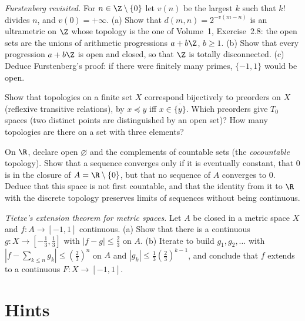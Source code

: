 \begin{exercise}[$\star\star$]\label{ex:furstenberg}
\emph{Furstenberg revisited.} For $n\in\Z\setminus\{0\}$ let $v(n)$ be the largest $k$ such that $k!$ divides $n$, and $v(0)=+\infty$. (a) Show that $d(m,n)=2^{-v(m-n)}$
is an ultrametric on $\Z$ whose topology is the one of Volume~1, Exercise~2.8: the open sets are the unions of arithmetic progressions $a+b\Z$,
$b\ge1$. (b) Show that every progression $a+b\Z$ is open and closed, so that $\Z$ is totally disconnected. (c) Deduce Furstenberg's proof: if there
were finitely many primes, $\{-1,1\}$ would be open.
\end{exercise}

\begin{exercise}[$\star\star$]\label{ex:finite}
Show that topologies on a finite set $X$ correspond bijectively to preorders on $X$ (reflexive transitive relations), by $x\preceq y$ iff $x\in\overline{\{y\}}$.
Which preorders give $T_0$ spaces (two distinct points are distinguished by an open set)? How many topologies are there on a set with
three elements?
\end{exercise}

\begin{exercise}[$\star\star$]\label{ex:cocountable}
On $\R$, declare open $\varnothing$ and the complements of countable sets (the \emph{cocountable} topology). Show that a sequence converges only if it is
eventually constant, that $0$ is in the closure of $A=\R\setminus\{0\}$, but that no sequence of $A$ converges to $0$. Deduce that this space is not first
countable, and that the identity from it to $\R$ with the discrete topology preserves limits of sequences without being continuous.
\end{exercise}

\begin{exercise}[$\star\star\star$]\label{ex:tietze}
\emph{Tietze's extension theorem for metric spaces.} Let $A$ be closed in a metric space $X$ and $f:A\to[-1,1]$ continuous. (a) Show that there is a
continuous $g:X\to[-\frac13,\frac13]$ with $|f-g|\le\frac23$ on $A$. (b) Iterate to build $g_1,g_2,\ldots$ with $|f-\sum_{k\le n}g_k|\le(\frac23)^n$ on $A$ and
$|g_k|\le\frac13(\frac23)^{k-1}$, and conclude that $f$ extends to a continuous $F:X\to[-1,1]$.
\end{exercise}

\section{Hints}

